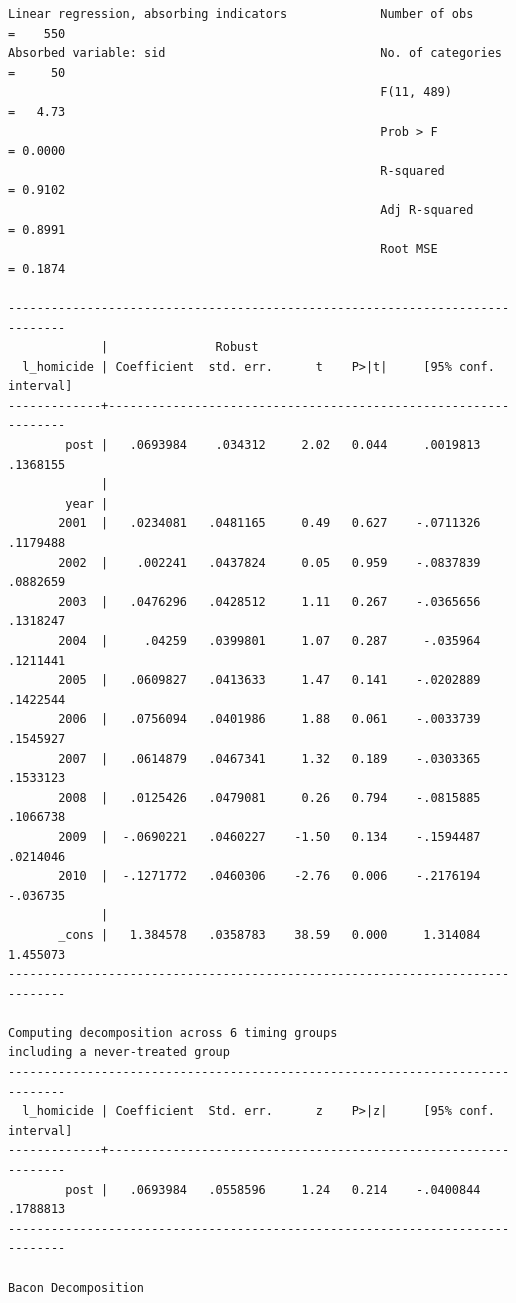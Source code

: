 \documentclass[
]{book}
\begin{document}
\begin{verbatim}
Linear regression, absorbing indicators             Number of obs     =    550
Absorbed variable: sid                              No. of categories =     50
                                                    F(11, 489)        =   4.73
                                                    Prob > F          = 0.0000
                                                    R-squared         = 0.9102
                                                    Adj R-squared     = 0.8991
                                                    Root MSE          = 0.1874

------------------------------------------------------------------------------
             |               Robust
  l_homicide | Coefficient  std. err.      t    P>|t|     [95% conf. interval]
-------------+----------------------------------------------------------------
        post |   .0693984    .034312     2.02   0.044     .0019813    .1368155
             |
        year |
       2001  |   .0234081   .0481165     0.49   0.627    -.0711326    .1179488
       2002  |    .002241   .0437824     0.05   0.959    -.0837839    .0882659
       2003  |   .0476296   .0428512     1.11   0.267    -.0365656    .1318247
       2004  |     .04259   .0399801     1.07   0.287     -.035964    .1211441
       2005  |   .0609827   .0413633     1.47   0.141    -.0202889    .1422544
       2006  |   .0756094   .0401986     1.88   0.061    -.0033739    .1545927
       2007  |   .0614879   .0467341     1.32   0.189    -.0303365    .1533123
       2008  |   .0125426   .0479081     0.26   0.794    -.0815885    .1066738
       2009  |  -.0690221   .0460227    -1.50   0.134    -.1594487    .0214046
       2010  |  -.1271772   .0460306    -2.76   0.006    -.2176194    -.036735
             |
       _cons |   1.384578   .0358783    38.59   0.000     1.314084    1.455073
------------------------------------------------------------------------------

Computing decomposition across 6 timing groups
including a never-treated group
------------------------------------------------------------------------------
  l_homicide | Coefficient  Std. err.      z    P>|z|     [95% conf. interval]
-------------+----------------------------------------------------------------
        post |   .0693984   .0558596     1.24   0.214    -.0400844    .1788813
------------------------------------------------------------------------------

Bacon Decomposition


\end{verbatim}
\end{document}
